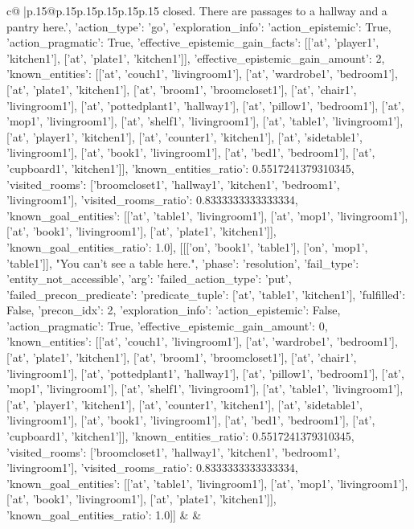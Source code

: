 \documentclass{article}
\begin{document}
{\begin{supertabular}{c@{$\;$}|p{.15\linewidth}@{}p{.15\linewidth}p{.15\linewidth}p{.15\linewidth}p{.15\linewidth}p{.15\linewidth}}
{{{closed. There are passages to a hallway and a pantry here.', {'action_type': 'go', 'exploration_info': {'action_epistemic': True, 'action_pragmatic': True, 'effective_epistemic_gain_facts': [['at', 'player1', 'kitchen1'], ['at', 'plate1', 'kitchen1']], 'effective_epistemic_gain_amount': 2, 'known_entities': [['at', 'couch1', 'livingroom1'], ['at', 'wardrobe1', 'bedroom1'], ['at', 'plate1', 'kitchen1'], ['at', 'broom1', 'broomcloset1'], ['at', 'chair1', 'livingroom1'], ['at', 'pottedplant1', 'hallway1'], ['at', 'pillow1', 'bedroom1'], ['at', 'mop1', 'livingroom1'], ['at', 'shelf1', 'livingroom1'], ['at', 'table1', 'livingroom1'], ['at', 'player1', 'kitchen1'], ['at', 'counter1', 'kitchen1'], ['at', 'sidetable1', 'livingroom1'], ['at', 'book1', 'livingroom1'], ['at', 'bed1', 'bedroom1'], ['at', 'cupboard1', 'kitchen1']], 'known_entities_ratio': 0.5517241379310345, 'visited_rooms': ['broomcloset1', 'hallway1', 'kitchen1', 'bedroom1', 'livingroom1'], 'visited_rooms_ratio': 0.8333333333333334, 'known_goal_entities': [['at', 'table1', 'livingroom1'], ['at', 'mop1', 'livingroom1'], ['at', 'book1', 'livingroom1'], ['at', 'plate1', 'kitchen1']], 'known_goal_entities_ratio': 1.0}}], [[['on', 'book1', 'table1'], ['on', 'mop1', 'table1']], "You can't see a table here.", {'phase': 'resolution', 'fail_type': 'entity_not_accessible', 'arg': {'failed_action_type': 'put', 'failed_precon_predicate': {'predicate_tuple': ['at', 'table1', 'kitchen1'], 'fulfilled': False, 'precon_idx': 2}}, 'exploration_info': {'action_epistemic': False, 'action_pragmatic': True, 'effective_epistemic_gain_amount': 0, 'known_entities': [['at', 'couch1', 'livingroom1'], ['at', 'wardrobe1', 'bedroom1'], ['at', 'plate1', 'kitchen1'], ['at', 'broom1', 'broomcloset1'], ['at', 'chair1', 'livingroom1'], ['at', 'pottedplant1', 'hallway1'], ['at', 'pillow1', 'bedroom1'], ['at', 'mop1', 'livingroom1'], ['at', 'shelf1', 'livingroom1'], ['at', 'table1', 'livingroom1'], ['at', 'player1', 'kitchen1'], ['at', 'counter1', 'kitchen1'], ['at', 'sidetable1', 'livingroom1'], ['at', 'book1', 'livingroom1'], ['at', 'bed1', 'bedroom1'], ['at', 'cupboard1', 'kitchen1']], 'known_entities_ratio': 0.5517241379310345, 'visited_rooms': ['broomcloset1', 'hallway1', 'kitchen1', 'bedroom1', 'livingroom1'], 'visited_rooms_ratio': 0.8333333333333334, 'known_goal_entities': [['at', 'table1', 'livingroom1'], ['at', 'mop1', 'livingroom1'], ['at', 'book1', 'livingroom1'], ['at', 'plate1', 'kitchen1']], 'known_goal_entities_ratio': 1.0}}]] 
	  } 
	   } 
	   } 
	 & & \\ 
 


\end{supertabular}}
\end{document}
